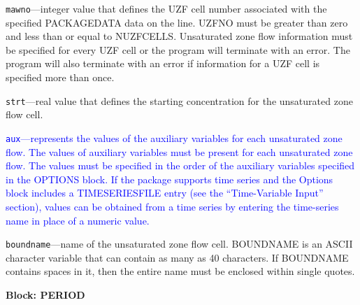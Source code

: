 \begin{description}
\item \texttt{mawno}---integer value that defines the UZF cell number associated with the specified PACKAGEDATA data on the line. UZFNO must be greater than zero and less than or equal to NUZFCELLS. Unsaturated zone flow information must be specified for every UZF cell or the program will terminate with an error.  The program will also terminate with an error if information for a UZF cell is specified more than once.

\item \texttt{strt}---real value that defines the starting concentration for the unsaturated zone flow cell.

\item \textcolor{blue}{\texttt{aux}---represents the values of the auxiliary variables for each unsaturated zone flow. The values of auxiliary variables must be present for each unsaturated zone flow. The values must be specified in the order of the auxiliary variables specified in the OPTIONS block.  If the package supports time series and the Options block includes a TIMESERIESFILE entry (see the ``Time-Variable Input'' section), values can be obtained from a time series by entering the time-series name in place of a numeric value.}

\item \texttt{boundname}---name of the unsaturated zone flow cell.  BOUNDNAME is an ASCII character variable that can contain as many as 40 characters.  If BOUNDNAME contains spaces in it, then the entire name must be enclosed within single quotes.

\end{description}
\item \textbf{Block: PERIOD}

